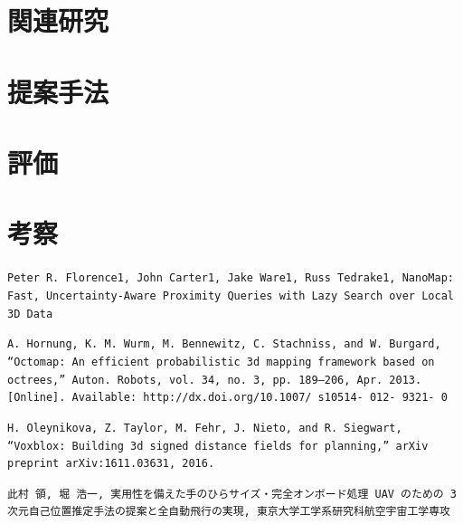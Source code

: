 \documentclass[a4j,10pt]{jsarticle}
\begin{document}
\section{関連研究}

\section{提案手法}

\section{評価}

\section{考察}

\begin{thebibliography}{99}
\texttt{Peter R. Florence1, John Carter1, Jake Ware1, Russ Tedrake1, NanoMap: Fast, Uncertainty-Aware Proximity Queries with Lazy Search over Local 3D Data}

\texttt{A. Hornung, K. M. Wurm, M. Bennewitz, C. Stachniss, and W. Burgard, “Octomap: An efficient probabilistic 3d mapping framework based on octrees,” Auton. Robots, vol. 34, no. 3, pp. 189–206, Apr. 2013. [Online]. Available: http://dx.doi.org/10.1007/ s10514- 012- 9321- 0}

\texttt{H. Oleynikova, Z. Taylor, M. Fehr, J. Nieto, and R. Siegwart, “Voxblox: Building 3d signed distance fields for planning,” arXiv preprint arXiv:1611.03631, 2016.}

\texttt{此村 領, 堀 浩一, 実用性を備えた手のひらサイズ・完全オンボード処理 UAV のための 3 次元自己位置推定手法の提案と全自動飛行の実現, 東京大学工学系研究科航空宇宙工学専攻}

\end{thebibliography}
\end{document}
